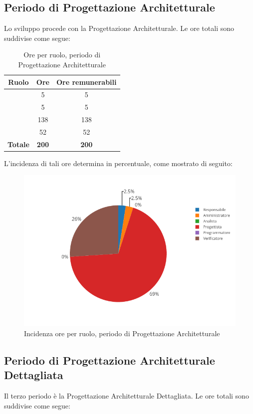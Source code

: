 \subsection{Periodo di Progettazione Architetturale}
Lo sviluppo procede con la Progettazione Architetturale. Le ore totali sono suddivise come segue:

\begin{table}[H]
	\begin{center}
		\begin{tabular}{|c|c|c|}
			\hline
			\textbf{Ruolo}	& \textbf{Ore}	& \textbf{Ore remunerabili} \\
			\hline
			\Res	&	5	&	5	\\
			\hline
			\Amm	&	5	&	5	\\
			\hline
			\Prog   &	138   &	138	\\
			\hline
			\Ver	&	52	&	52	\\
			\hline
			\textbf{Totale} & \textbf{200} & \textbf{200} \\
			\hline
		\end{tabular}
	\end{center}
	\caption{Ore per ruolo, periodo di Progettazione Architetturale}
\end{table}

L'incidenza di tali ore determina in percentuale, come mostrato di seguito:
\begin{figure}[H]
	\centering
	\includegraphics[scale=0.6]{img/ProgettazioneArchitetturale.png}
	\caption{Incidenza ore per ruolo, periodo di Progettazione Architetturale}
\end{figure}

\subsection{Periodo di Progettazione Architetturale Dettagliata}
Il terzo periodo è la Progettazione Architetturale Dettagliata. Le ore totali sono suddivise come segue:

